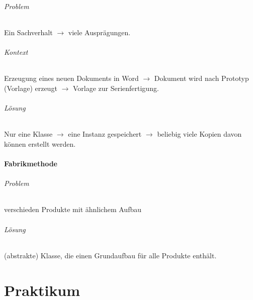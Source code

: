 \documentclass{scrreprt}
\begin{document}
\paragraph{Problem} Ein Sachverhalt $\to$ viele Ausprägungen.
\paragraph{Kontext} Erzeugung eines neuen Dokuments in Word $\to$ Dokument wird nach Prototyp (Vorlage) erzeugt $\to$ Vorlage zur Serienfertigung. 
\paragraph{Lösung} Nur eine Klasse $\to$ eine Instanz gespeichert $\to$ beliebig viele Kopien davon können erstellt werden.

\subsection{Fabrikmethode}
\paragraph{Problem} verschieden Produkte mit ähnlichem Aufbau
\paragraph{Lösung} (abstrakte) Klasse, die einen Grundaufbau für alle Produkte enthält.

\part{Praktikum}
\setcounter{chapter}{0}

\end{document}
